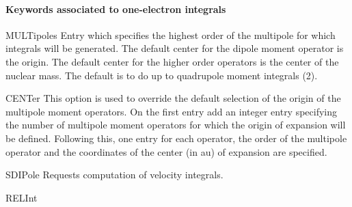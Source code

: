 \paragraph{Keywords associated to one-{}electron integrals}
\begin{keywordlist}
\item[MULTipoles]
Entry which specifies the highest order of the
multipole for which integrals will be generated. The default center
for the dipole moment operator is the origin.
The default center for the higher order operators is the
center of the nuclear mass.
The default is to do up to quadrupole moment integrals (2).
\item[CENTer]
This option is used to override the default selection of the origin
of the multipole moment operators.
On the first entry add an integer entry specifying the number of
multipole moment operators for which the origin of expansion
will be defined.
Following this, one entry for each operator, the order of
the multipole operator and the coordinates of the center (in au) of
expansion are specified.
\item[SDIPole]
Requests computation of velocity integrals.
\item[RELInt]

\end{keywordlist}

